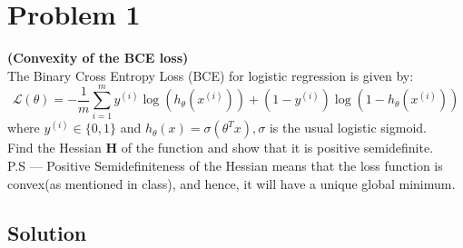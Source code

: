 \section*{Problem 1}

\textbf{(Convexity of the BCE loss)}\\
The Binary Cross Entropy Loss (BCE) for logistic regression is given by:
\[
    \mathcal{L}(\theta)=-\frac{1}{m} \sum_{i=1}^{m} y^{(i)} \log \left(h_{\theta}\left(x^{(i)}\right)\right)+\left(1-y^{(i)}\right) \log \left(1-h_{\theta}\left(x^{(i)}\right)\right)
\]
where \( y^{(i)} \in \{0,1\} \) and \( h_{\theta}(x)=\sigma\left(\theta^{T} x\right), \sigma \) is the usual logistic sigmoid.\\
Find the Hessian \( \mathbf{H} \) of the function and show that it is positive semidefinite.\\
P.S --- Positive Semidefiniteness of the Hessian means that the loss function is convex(as mentioned in class), and hence, it will have a unique global minimum.

\subsection*{Solution}

